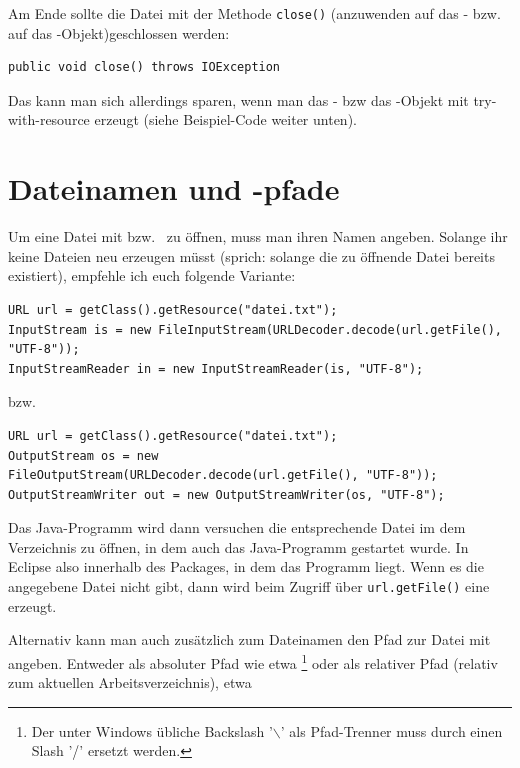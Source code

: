Am Ende sollte die Datei mit der Methode \lstinline|close()| (anzuwenden auf das
- bzw. auf das
-Objekt)geschlossen werden:

\begin{lstlisting}
public void close() throws IOException
\end{lstlisting}

Das kann man sich allerdings sparen, wenn man das - bzw
das -Objekt mit try-with-resource erzeugt (siehe
Beispiel-Code weiter unten).

\section{Dateinamen und -pfade}

Um eine Datei mit  bzw.\  zu
öffnen, muss man ihren Namen angeben. Solange ihr keine Dateien neu erzeugen
müsst (sprich: solange die zu öffnende Datei bereits existiert), empfehle ich
euch folgende Variante:

\begin{lstlisting}
URL url = getClass().getResource("datei.txt");
InputStream is = new FileInputStream(URLDecoder.decode(url.getFile(), "UTF-8"));
InputStreamReader in = new InputStreamReader(is, "UTF-8");
\end{lstlisting}

bzw.

\begin{lstlisting}
URL url = getClass().getResource("datei.txt");
OutputStream os = new FileOutputStream(URLDecoder.decode(url.getFile(), "UTF-8"));
OutputStreamWriter out = new OutputStreamWriter(os, "UTF-8");
\end{lstlisting}

Das Java-Programm wird dann versuchen die entsprechende Datei im dem
Verzeichnis zu öffnen, in dem auch das Java-Programm gestartet wurde. In
Eclipse also innerhalb des Packages, in dem das Programm liegt. Wenn es die
angegebene Datei nicht gibt, dann wird beim Zugriff über
\lstinline|url.getFile()| eine  erzeugt.

Alternativ kann man auch zusätzlich zum Dateinamen den Pfad zur Datei mit
angeben. Entweder als absoluter Pfad wie etwa
\footnote{Der unter Windows
übliche Backslash '\ensuremath{\backslash}' als Pfad-Trenner muss durch einen
Slash '/' ersetzt werden.} oder als relativer Pfad (relativ zum aktuellen
Arbeitsverzeichnis), etwa 


